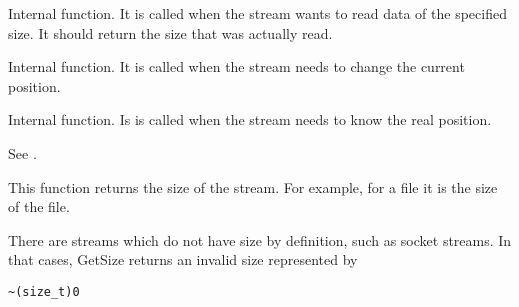 \label{wxstreambaseonsysread}


Internal function. It is called when the stream wants to read data of the
specified size. It should return the size that was actually read.



Internal function. It is called when the stream needs to change the
current position.



Internal function. Is is called when the stream needs to know the
real position.



See .

\label{wxstreambasegetsize}


This function returns the size of the stream. For example, for a file it is the size of
the file.


There are streams which do not have size by definition, such as socket streams.
In that cases, GetSize returns an invalid size represented by

\begin{verbatim}
~(size_t)0
\end{verbatim}

